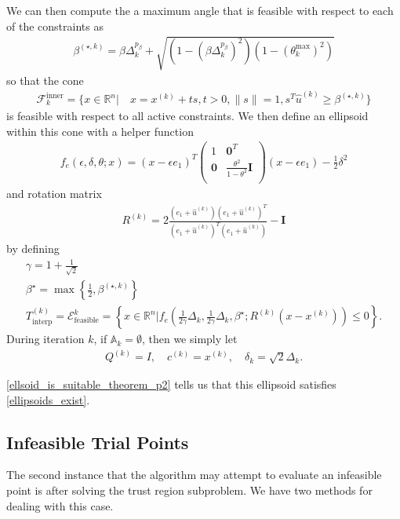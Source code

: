 \documentclass{article}
\theoremstyle{case}
\newcommand{\activeconstraintsk}{{\mathbb A_{k}}}
\newcommand{\bs}{{\beta^{\star}}}
\newcommand{\bsk}{{\beta^{(\star, k)}}}
\newcommand{\ck}{{c^{(k)}}}
\newcommand{\dk}{\Delta_k}
\newcommand{\fcki}{{\mathcal {F}^{\text{inner}}_k}}
\newcommand{\huk}{{{\hat u}^{(k)}}}
\newcommand{\qk}{{Q^{(k)}}}
\newcommand{\Rn}{\mathbb R^n}
\newcommand{\rotk}{{R^{(k)}}}
\newcommand{\sampletrk}{{T_{\text{interp}}^{(k)}}}
\newcommand{\sdk}{{\delta_k}}
\newcommand{\unshiftedellipsoid}{{\mathcal E^k_{\text{feasible}}}}
\newcommand{\xk}{{x^{(k)}}}
\begin{document}
We can then compute the a maximum angle that is feasible with respect to each of the constraints as
\begin{align}
\bsk = \beta\dk^{p_{\beta}} + \sqrt{\left(1 - \left(\beta\dk^{p_{\beta}}\right)^2\right)\left(1 - (\theta^{\text{max}}_k) ^2\right)} \label{define_bsk}
\end{align}
so that the cone
\begin{align}
\fcki = \{x \in \Rn | \quad x = \xk + ts, t > 0, \|s\| = 1, s^T\huk \ge \bsk \} \label{define_inner_cone}
\end{align}
is feasible with respect to all active constraints.
We then define an ellipsoid within this cone with a helper function
\begin{align}
f_e(\epsilon, \delta, \theta; x) = (x - \epsilon e_1)^T\begin{pmatrix}
1 & \boldsymbol0^T \\
\boldsymbol 0 & \frac{\theta^2}{1 - \theta^2} \boldsymbol I \\
\end{pmatrix}(x - \epsilon e_1) - \frac 1 2 \delta^2 \label{define_ellipse_function}
\end{align}
and rotation matrix
\begin{align}
\rotk = 2\frac{(e_1 + \huk)(e_1 + \huk)^T}{(e_1 + \huk)^T(e_1 + \huk)} - \boldsymbol I \label{define_rotation}
\end{align}
by defining
\begin{align}
\gamma = 1 + \frac 1 {\sqrt{2}} \\
\bs = \max\left\{\frac 1 2 , \bsk\right\} \\
\sampletrk = \unshiftedellipsoid = \left\{x \in \Rn | f_e\left(\frac 1 {2\gamma} \dk, \frac 1 {2\gamma} \dk, \bs; \rotk(x - \xk)\right) \le 0\right\}. \label{define_ellipsek}
\end{align}
During iteration $k$, if $\activeconstraintsk = \emptyset$, then we simply let
\begin{align*}
\qk = I, \quad \ck = \xk, \quad \sdk = \sqrt{2} \dk.
\end{align*}


\cref{ellsoid_is_suitable_theorem_p2} tells us that this ellipsoid satisfies \cref{ellipsoids_exist}.

\subsection{Infeasible Trial Points}
\label{convex_model_reduction}

The second instance that the algorithm may attempt to evaluate an infeasible point is after solving the trust region subproblem.
We have two methods for dealing with this case.
\end{document}
